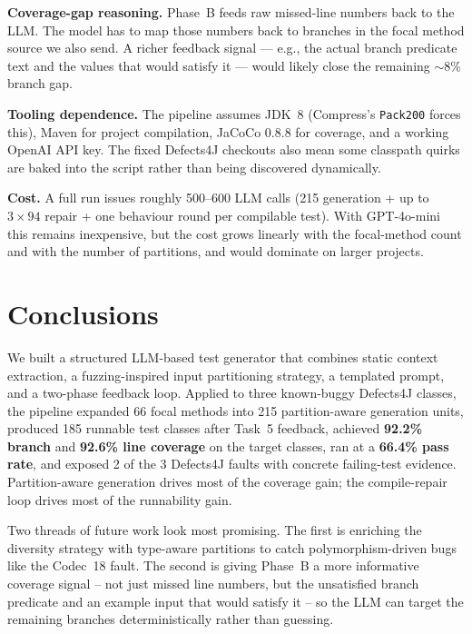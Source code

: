 \documentclass[conference]{IEEEtran}
\begin{document}
\textbf{Coverage-gap reasoning.} Phase~B feeds raw missed-line numbers
back to the LLM. The model has to map those numbers back to branches
in the focal method source we also send. A richer feedback signal ---
e.g., the actual branch predicate text and the values that would
satisfy it --- would likely close the remaining ${\sim}8$\% branch
gap.

\textbf{Tooling dependence.} The pipeline assumes JDK~8 (Compress's
\texttt{Pack200} forces this), Maven for project compilation, JaCoCo
0.8.8 for coverage, and a working OpenAI API key. The fixed Defects4J
checkouts also mean some classpath quirks are baked into the script
rather than being discovered dynamically.

\textbf{Cost.} A full run issues roughly 500--600 LLM calls (215
generation + up to $3\times94$ repair + one behaviour round per
compilable test). With GPT-4o-mini this remains inexpensive, but the
cost grows linearly with the focal-method count and with the number
of partitions, and would dominate on larger projects.

\section{Conclusions}
\label{sec:conclusions}

We built a structured LLM-based test generator that combines static
context extraction, a fuzzing-inspired input partitioning strategy, a
templated prompt, and a two-phase feedback loop. Applied to three
known-buggy Defects4J classes, the pipeline expanded 66 focal methods
into 215 partition-aware generation units, produced 185 runnable
test classes after Task~5 feedback, achieved \textbf{92.2\% branch}
and \textbf{92.6\% line coverage} on the target classes, ran at a
\textbf{66.4\% pass rate}, and exposed 2 of the 3 Defects4J faults
with concrete failing-test evidence. Partition-aware generation drives
most of the coverage gain; the compile-repair loop drives most of the
runnability gain.

Two threads of future work look most promising. The first is enriching
the diversity strategy with type-aware partitions to catch
polymorphism-driven bugs like the Codec~18 fault. The second is
giving Phase~B a more informative coverage signal -- not just missed
line numbers, but the unsatisfied branch predicate and an example
input that would satisfy it -- so the LLM can target the remaining
branches deterministically rather than guessing.
\end{document}
